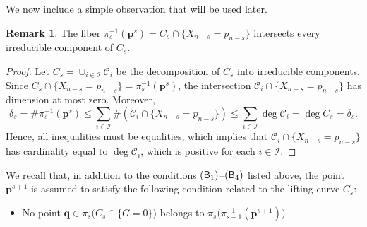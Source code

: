\documentclass[pdflatex,sn-basic]{sn-jnl}%
\theoremstyle{thmstyleone}%
\theoremstyle{thmstyletwo}%
\theoremstyle{thmstylethree}%
\theoremstyle{definition}
\newtheorem{remark}[theorem]{Remark}
\numberwithin{equation}{section}
\newcommand{\bfs}{\boldsymbol}
\begin{document}
We now include a simple observation that will be used
later.
%
\begin{remark}\label{rem: fiber meets every irred comp curve}
The fiber $\pi_s^{-1}(\bfs p^s)=C_s\cap\{X_{n-s}=p_{n-s}\}$ intersects
every irreducible component of $C_s$.
\end{remark}
%
\begin{proof}
Let $C_s=\cup_{i\in\mathcal{I}}\mathcal{C}_i$ be the decomposition
of $C_s$ into irreducible components. Since
$C_s\cap\{X_{n-s}=p_{n-s}\}=\pi_s^{-1}(\bfs p^s)$, the intersection
$\mathcal{C}_i\cap\{X_{n-s}=p_{n-s}\}$ has dimension at most zero.
Moreover,
%
$$\delta_s=\#\pi_s^{-1}(\bfs p^s)\le \sum_{i\in\mathcal{I}}
\#(\mathcal{C}_i\cap\{X_{n-s}=p_{n-s}\})\le \sum_{i\in\mathcal{I}}
\deg\mathcal{C}_i=\deg C_s=\delta_s.$$
%
Hence, all inequalities must be equalities, which implies that
$\mathcal{C}_i\cap\{X_{n-s}=p_{n-s}\}$ has cardinality equal to
$\deg\mathcal{C}_i$, which is positive for each $i\in\mathcal{I}$.
\end{proof}

We recall that, in addition to the conditions $({\sf B}_1)$--$({\sf B}_4)$
listed above,
the point $\bfs p^{s+1}$ is assumed to satisfy the following condition related to
the lifting curve $C_s$:
%
\begin{itemize}
  \item[$({\sf B}_5)$] No point $\bfs
q\in \pi_s\big(C_s\cap\{G=0\}\big)$ belongs to
$\pi_s\big(\pi_{s+1}^{-1}(\bfs p^{s+1})\big)$.
\end{itemize}
\end{document}
